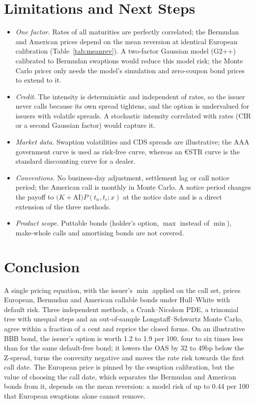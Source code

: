 \documentclass[11pt,a4paper]{article}
\newcommand{\AI}{\mathrm{AI}}
\begin{document}
\section{Limitations and Next Steps}\label{sec:limitations}
\begin{itemize}
\item \emph{One factor.} Rates of all maturities are perfectly correlated; the Bermudan and American prices depend on
the mean reversion at identical European calibration (Table~\ref{tab:meanrev}). A two-factor Gaussian model (G2++)
calibrated to Bermudan swaptions would reduce this model risk; the Monte Carlo pricer only needs the model's
simulation and zero-coupon bond prices to extend to it.
\item \emph{Credit.} The intensity is deterministic and independent of rates, so the issuer never calls because its
own spread tightens, and the option is undervalued for issuers with volatile spreads. A stochastic intensity
correlated with rates (CIR or a second Gaussian factor) would capture it.
\item \emph{Market data.} Swaption volatilities and CDS spreads are illustrative; the AAA government curve is used as
risk-free curve, whereas an €STR curve is the standard discounting curve for a dealer.
\item \emph{Conventions.} No business-day adjustment, settlement lag or call notice period; the American call is
monthly in Monte Carlo. A notice period changes the payoff to $\big(K + \AI\big)P(t_n, t_c; x)$ at the notice date
and is a direct extension of the three methods.
\item \emph{Product scope.} Puttable bonds (holder's option, $\max$ instead of $\min$), make-whole calls and
amortising bonds are not covered.
\end{itemize}

\section{Conclusion}
A single pricing equation, with the issuer's $\min$ applied on the call set, prices European, Bermudan and American
callable bonds under Hull--White with default risk. Three independent methods, a Crank--Nicolson PDE, a trinomial tree
with unequal steps and an out-of-sample Longstaff--Schwartz Monte Carlo, agree within a fraction of a cent and
reprice the closed forms. On an illustrative BBB bond, the issuer's option is worth 1.2 to 1.9 per 100, four to six
times less than for the same default-free bond; it lowers the OAS by 32 to 49bp below the Z-spread, turns the convexity
negative and moves the rate risk towards the first call date. The European price is pinned by the swaption
calibration, but the value of choosing the call date, which separates the Bermudan and American bonds from it,
depends on the mean reversion: a model risk of up to 0.44 per 100 that European swaptions alone cannot remove.
\end{document}
